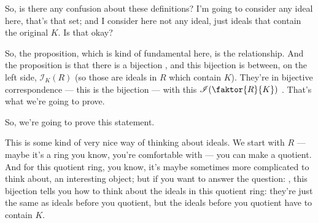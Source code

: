 \begin{speech}[00:18:40 - 00:20:07]
So, is there any confusion about these definitions? I'm going to consider any ideal here, that's that set; and I consider here not any ideal, just ideals that contain the original $K$. Is that okay?

So, the proposition, which is kind of fundamental here, is the relationship. And the proposition is that there is a bijection , and this bijection is between, on the left side, $\mathscr{I}_K(R)$  (so those are ideals in $R$ which contain $K$). They're in bijective correspondence --- this is the bijection  --- with this $\mathscr{I}(\faktor{R}{K})$ . That's what we're going to prove.

So, we're going to prove this statement.

This is some kind of very nice way of thinking about ideals. We start with $R$ --- maybe it's a ring you know, you're comfortable with --- you can make a quotient. And for this quotient ring, you know, it's maybe sometimes more complicated to think about, an interesting object; but if you want to answer the question: , this bijection tells you how to think about the ideals in this quotient ring: they're just the same as ideals before you quotient, but the ideals before you quotient have to contain $K$.
\end{speech}

